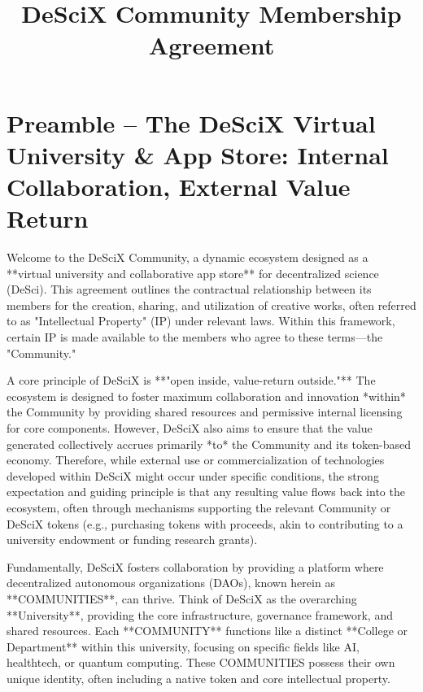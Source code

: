 \documentclass{article}
\begin{document}
\title{DeSciX Community Membership Agreement}
\maketitle

\tableofcontents

\section{Preamble – The DeSciX Virtual University \& App Store: Internal Collaboration, External Value Return}

Welcome to the DeSciX Community, a dynamic ecosystem designed as a **virtual university and collaborative app store** for decentralized science (DeSci). This agreement outlines the contractual relationship between its members for the creation, sharing, and utilization of creative works, often referred to as "Intellectual Property" (IP) under relevant laws. Within this framework, certain IP is made available to the members who agree to these terms—the "Community."

A core principle of DeSciX is **"open inside, value-return outside."** The ecosystem is designed to foster maximum collaboration and innovation *within* the Community by providing shared resources and permissive internal licensing for core components. However, DeSciX also aims to ensure that the value generated collectively accrues primarily *to* the Community and its token-based economy. Therefore, while external use or commercialization of technologies developed within DeSciX might occur under specific conditions, the strong expectation and guiding principle is that any resulting value flows back into the ecosystem, often through mechanisms supporting the relevant Community or DeSciX tokens (e.g., purchasing tokens with proceeds, akin to contributing to a university endowment or funding research grants).

Fundamentally, DeSciX fosters collaboration by providing a platform where decentralized autonomous organizations (DAOs), known herein as **COMMUNITIES**, can thrive. Think of DeSciX as the overarching **University**, providing the core infrastructure, governance framework, and shared resources. Each **COMMUNITY** functions like a distinct **College or Department** within this university, focusing on specific fields like AI, healthtech, or quantum computing. These COMMUNITIES possess their own unique identity, often including a native token and core intellectual property.
\end{document}
